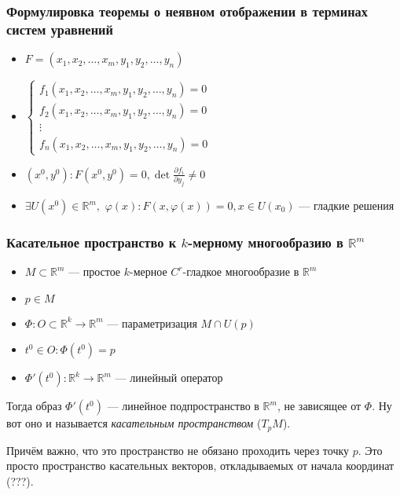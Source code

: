 \documentclass{article}
\def\dbl{\,\,}
\begin{document}
\subsubsection{Формулировка теоремы о неявном отображении в терминах систем уравнений}
\begin{itemize}
    \item $F = (x_1, x_2, \ldots, x_m, y_1, y_2, \ldots, y_n)$
    \item $\begin{cases}
        f_1(x_1, x_2, \ldots, x_m, y_1, y_2, \ldots, y_n) = 0\\
        f_2(x_1, x_2, \ldots, x_m, y_1, y_2, \ldots, y_n) = 0\\
        \vdots\\
        f_n(x_1, x_2, \ldots, x_m, y_1, y_2, \ldots, y_n) = 0
    \end{cases}$
    \item $(x^0, y^0): F(x^0, y^0) = 0, \det \frac{\partial f_i}{\partial y_j} \neq 0$
    \item $\exists U(x^0) \in \mathbb{R}^m, \dbl \varphi(x): F(x, \varphi(x)) = 0, x \in U(x_0)$ --- гладкие решения
\end{itemize}

\subsubsection{Касательное пространство к $k$-мерному многообразию в $\mathbb{R}^m$}

\begin{itemize}
    \item $M \subset \mathbb{R}^m$ --- простое $k$-мерное $C^r$-гладкое многообразие в $\mathbb{R}^m$
    \item $p \in M$
    \item $\Phi: O \subset \mathbb{R}^k \rightarrow \mathbb{R}^m$ --- параметризация $M \cap U(p)$
    \item $t^0 \in O: \Phi(t^0) = p$
    \item $\Phi'(t^0): \mathbb{R}^k \rightarrow \mathbb{R}^m$ --- линейный оператор
\end{itemize}

Тогда образ $\Phi'(t^0)$ --- линейное подпространство в $\mathbb{R}^m$, не зависящее от $\Phi$. Ну вот оно и называется \textit{касательным пространством} ($T_p M$).

Причём важно, что это пространство не обязано проходить через точку $p$. Это просто пространство касательных векторов, откладываемых от начала координат (???). 
\end{document}
